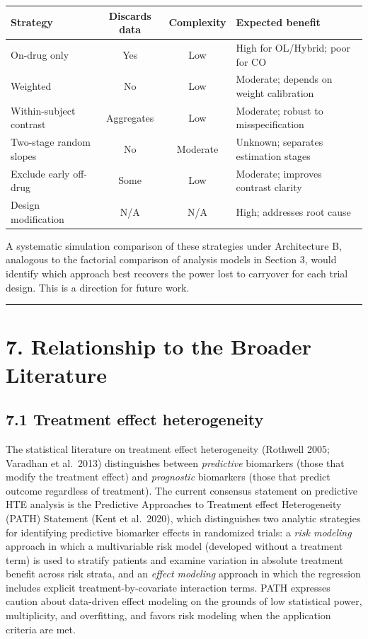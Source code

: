 \documentclass[
]{article}
\begin{document}
\begin{table}[htbp]
\centering
\begin{tabular}{lccp{5cm}}
\toprule
Strategy & Discards data & Complexity & Expected benefit \\
\midrule
On-drug only & Yes & Low & High for OL/Hybrid; poor for CO \\
Weighted & No & Low & Moderate; depends on weight calibration \\
Within-subject contrast & Aggregates & Low & Moderate; robust to misspecification \\
Two-stage random slopes & No & Moderate & Unknown; separates estimation stages \\
Exclude early off-drug & Some & Low & Moderate; improves contrast clarity \\
Design modification & N/A & N/A & High; addresses root cause \\
\bottomrule
\end{tabular}
\end{table}

A systematic simulation comparison of these strategies under
Architecture B, analogous to the factorial comparison of analysis
models in Section 3, would identify which approach best recovers
the power lost to carryover for each trial design. This is a
direction for future work.

\bigskip\noindent

\rule{\textwidth}{0.4pt}\bigskip

\section{7. Relationship to the Broader Literature}

\subsection{7.1 Treatment effect heterogeneity}

The statistical literature on treatment effect heterogeneity
(Rothwell 2005; Varadhan et al.~2013) distinguishes between
\textit{predictive} biomarkers (those that modify the treatment
effect) and \textit{prognostic} biomarkers (those that predict
outcome regardless of treatment). The current consensus
statement on predictive HTE analysis is the Predictive
Approaches to Treatment effect Heterogeneity (PATH) Statement
(Kent et al.~2020), which distinguishes two analytic strategies
for identifying predictive biomarker effects in randomized
trials: a \textit{risk modeling} approach in which a multivariable
risk model (developed without a treatment term) is used to
stratify patients and examine variation in absolute treatment
benefit across risk strata, and an \textit{effect modeling} approach
in which the regression includes explicit treatment-by-covariate
interaction terms. PATH expresses caution about data-driven
effect modeling on the grounds of low statistical power,
multiplicity, and overfitting, and favors risk modeling when
the application criteria are met.
\end{document}
